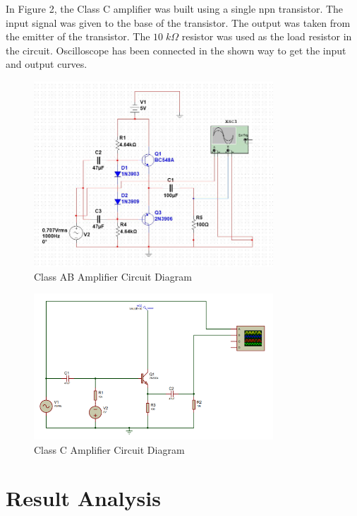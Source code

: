 \documentclass[12pt]{article}
\begin{document}
In Figure 2, the Class C amplifier was built using a single npn transistor. The input signal was given to the base of the transistor. The output was taken from the emitter of the transistor. The $10 \; k\Omega$ resistor was used as the load resistor in the circuit. Oscilloscope has been connected in the shown way to get the input and output curves.

\begin{figure}[!htpb]
    \centering
    \includegraphics[width=0.8\textwidth]{Class_AB_Diagram.jpg}
    \caption{Class AB Amplifier Circuit Diagram}
\end{figure}

\begin{figure}[!htpb]
    \centering
    \includegraphics[width=0.8\textwidth]{Class_C_Diagram.png}
    \caption{Class C Amplifier Circuit Diagram}
\end{figure}

\FloatBarrier
\section{Result Analysis}
\end{document}
